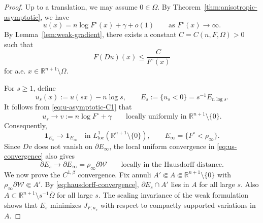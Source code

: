 \documentclass[11pt,reqno]{amsart}
\theoremstyle{definition}
\theoremstyle{remark}
\numberwithin{equation}{section}
\begin{document}
\begin{proof}
Up to a translation, we may assume $0\in\Omega$. By
Theorem~\ref{thm:anisotropic-asymptotic}, we have
\begin{equation}
\label{eq:u-asymptotic-C1}
 u(x)=n\log F^\circ(x)+\gamma+o(1)
 \qquad\text{as }F^\circ(x)\longrightarrow\infty.
\end{equation}
By Lemma~\ref{lem:weak-gradient}, there exists a constant
$C=C(n,F,\Omega)>0$ such that
\begin{equation}
\label{eq:scale-gradient-C1}
 F(Du)(x)\leq \frac{C}{F^\circ(x)}
\end{equation}
for a.e. $x\in\mathbb R^{n+1}\setminus\Omega$.

For $s\geq1$, define
\begin{equation*}
 u_s(x):=u(sx)-n\log s,
 \qquad
 E_s:=\{u_s<0\}=s^{-1}E_{n\log s}.
\end{equation*}
It follows from \eqref{eq:u-asymptotic-C1} that
\begin{equation}
\label{eq:us-convergence}
 u_s\longrightarrow v:=n\log F^\circ+\gamma
 \qquad\text{locally uniformly in }
 \mathbb{R}^{n+1}\setminus\{0\}.
\end{equation}
Consequently,
\begin{equation}
\label{eq:set-convergence}
 \mathbf{1}_{E_s}\longrightarrow\mathbf{1}_{E_\infty}
 \quad\text{in }L^1_{\mathrm{loc}}
 (\mathbb{R}^{n+1}\setminus\{0\}),
 \qquad
 E_\infty=\{F^\circ<\rho_\infty\}.
\end{equation}
Since $Dv$ does not vanish on $\partial E_\infty$, the local uniform
convergence in \eqref{eq:us-convergence} also gives
\begin{equation}
\label{eq:hausdorff-convergence}
 \partial E_s\longrightarrow
 \partial E_\infty=\rho_\infty\partial\mathcal W
 \qquad\text{locally in the Hausdorff distance}.
\end{equation}
We now prove the $C^{1,\beta}$ convergence. Fix annuli
$A'\Subset A\Subset\mathbb{R}^{n+1}\setminus\{0\}$ with
$\rho_\infty\partial\mathcal W\Subset A'$. By
\eqref{eq:hausdorff-convergence}, $\partial E_s\cap A'$ lies in $A$ for all
large $s$. Also $A\subset\mathbb{R}^{n+1}\setminus s^{-1}\overline{\Omega}$
for all large $s$. The scaling invariance of the weak formulation shows that
$E_s$ minimizes $J_{F,u_s}$ with respect to compactly supported variations in
$A$.


\end{proof}
\end{document}
